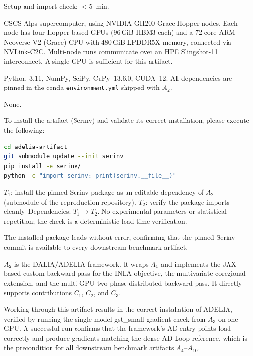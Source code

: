 \documentclass[nonacm,sigconf]{acmart}
\begin{document}
\arttime

Setup and import check: $<$5~min.

\artin


CSCS Alps supercomputer, using NVIDIA GH200 Grace Hopper nodes.
Each node has four Hopper-based GPUs (96\,GiB HBM3 each) and a
72-core ARM Neoverse V2 (Grace) CPU with 480\,GiB LPDDR5X
memory, connected via NVLink-C2C. Multi-node runs communicate
over an HPE Slingshot-11 interconnect. A single GPU is
sufficient for this artifact.


Python~3.11, NumPy, SciPy, CuPy~13.6.0, CUDA~12. All
dependencies are pinned in the conda \texttt{environment.yml}
shipped with $A_2$.


None.

To install the artifact (Serinv) and validate its correct installation, please execute the following:
\begin{lstlisting}[language=bash]
cd adelia-artifact
git submodule update --init serinv
pip install -e serinv/
python -c "import serinv; print(serinv.__file__)"
\end{lstlisting}

\artcomp

$T_1$: install the pinned Serinv package as an editable
dependency of $A_2$ (submodule of the reproduction repository).
$T_2$: verify the package imports cleanly.
Dependencies: $T_1 \rightarrow T_2$. No experimental parameters
or statistical repetition; the check is a deterministic
load-time verification.

\artout

The installed package loads without error, confirming that the
pinned Serinv commit is available to every downstream
benchmark artifact.


\newartifact

\artrel

$A_2$ is the DALIA/ADELIA framework. It wraps $A_1$ and implements
the JAX-based custom backward pass for the INLA objective, the
multivariate coregional extension, and the multi-GPU two-phase
distributed backward pass. It directly supports contributions
$C_1$, $C_2$, and $C_3$.

\artexp

Working through this artifact results in the correct installation
of ADELIA, verified by running the single-model gst\_small
gradient check from $A_3$ on one GPU. A successful run confirms
that the framework's AD entry points load correctly and produce
gradients matching the dense AD-Loop reference, which is the
precondition for all downstream benchmark artifacts
$A_4$--$A_{10}$.
\end{document}
